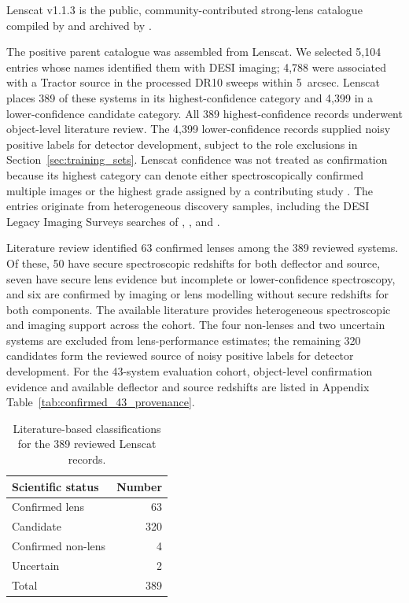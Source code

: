 Lenscat v1.1.3 is the public, community-contributed strong-lens catalogue
compiled by \citet{Vujeva2025} and archived by \citet{LenscatV113}.

The positive parent catalogue was assembled from Lenscat. We selected
5,104 entries whose names identified them with DESI imaging; 4,788 were
associated with a Tractor source in the processed DR10 sweeps within
5~arcsec. Lenscat places 389 of these systems in its highest-confidence
category and 4,399 in a lower-confidence candidate category. All 389
highest-confidence records underwent object-level literature review. The
4,399 lower-confidence records supplied noisy positive labels for detector
development, subject to the role exclusions in
Section~\ref{sec:training_sets}. Lenscat
confidence was not treated as confirmation because its highest category can
denote either spectroscopically confirmed multiple images or the highest grade
assigned by a contributing study \citep{Vujeva2025}. The entries originate from heterogeneous
discovery samples, including the DESI Legacy Imaging Surveys searches of
\citet{Huang2020,Huang2021}, \citet{Stein2022}, and \citet{Storfer2024}.

Literature review identified 63 confirmed lenses among the 389 reviewed
systems. Of these, 50 have secure spectroscopic redshifts for both deflector
and source, seven have secure lens evidence but incomplete or
lower-confidence spectroscopy, and six are confirmed by imaging or lens
modelling without secure redshifts for both components. The available
literature provides heterogeneous spectroscopic and imaging support across
the cohort. The four non-lenses and two uncertain systems are excluded from
lens-performance estimates; the remaining 320 candidates form the reviewed
source of noisy positive labels for detector development. For the 43-system
evaluation cohort, object-level confirmation evidence and available
deflector and source redshifts are listed in Appendix
Table~\ref{tab:confirmed_43_provenance}.

\begin{table}
\caption{Literature-based classifications for the 389 reviewed Lenscat
records.}
\label{tab:evidence_review_status}
\centering
\begin{tabular}{lr}
\toprule
Scientific status & Number \\
\midrule
Confirmed lens & 63 \\
Candidate & 320 \\
Confirmed non-lens & 4 \\
Uncertain & 2 \\
\midrule
Total & 389 \\
\bottomrule
\end{tabular}
\end{table}

